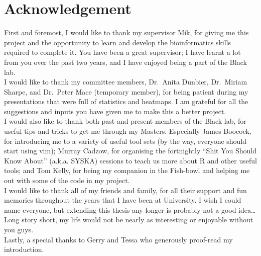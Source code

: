 
\vspace*{\fill}

\section*{\centering Acknowledgement}

First and foremost, I would like to thank my supervisor Mik, for giving me this project and the opportunity to learn and develop the bioinformatics skills required to complete it.
You have been a great supervisor; I have learnt a lot from you over the past two years, and I have enjoyed being a part of the Black lab.
\\

\noindent
I would like to thank my committee members, Dr.\ Anita Dunbier, Dr.\ Miriam Sharpe, and Dr.\ Peter Mace (temporary member), for being patient during my presentations that were full of statistics and heatmaps.
I am grateful for all the suggestions and inputs you have given me to make this a better project.
\\

\noindent
I would also like to thank both past and present members of the Black lab, for useful tips and tricks to get me through my Masters.
Especially James Boocock, for introducing me to a variety of useful tool sets (by the way, everyone should start using vim); Murray Cadzow, for organising the fortnightly ``Shit You Should Know About'' (a.k.a. SYSKA) sessions to teach us more about R and other useful tools; and Tom Kelly, for being my companion in the Fish-bowl and helping me out with some of the code in my project.
\\

\noindent
I would like to thank all of my friends and family, for all their support and fun memories throughout the years that I have been at University.
I wish I could name everyone, but extending this thesis any longer is probably not a good idea\ldots{}
Long story short, my life would not be nearly as interesting or enjoyable without you guys.
\\

\noindent
Lastly, a special thanks to Gerry and Tessa who generously proof-read my introduction.
\\

\vfill

